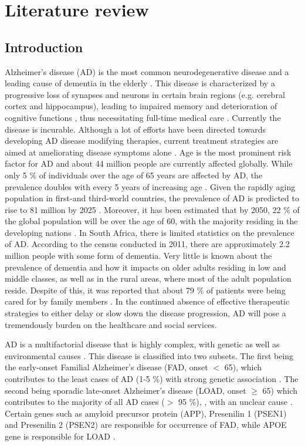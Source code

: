\chapter{Literature review}
\section{Introduction}
Alzheimer’s disease (AD) is the most common neurodegenerative disease and a leading cause of dementia in the elderly \citep{andrieu2015}. This disease is characterized by a progressive loss of synapses and neurons in certain brain regions (e.g. cerebral cortex and hippocampus), leading to impaired memory and deterioration of cognitive functions \citep{dekosky1990,scheff2006,zare-shahabadi2015}, thus necessitating full-time medical care \citep{prince2013}. Currently the disease is incurable. Although a lot of efforts have been directed towards developing AD disease modifying therapies, current treatment strategies are aimed at ameliorating disease symptoms alone \citep{anand2014,disanto2013}. Age is the most prominent risk factor for AD and about 44 million people are currently affected globally. While only 5 \% of individuals over the age of 65 years are affected by AD, the prevalence doubles with every 5 years of increasing age \citep{pimenova2018,qiu2009}. Given the rapidly aging population in first-and third-world countries, the prevalence of AD is predicted to rise to 81 million by 2025 \citep{AlzheimersAssociation2014,Ferri2005}. Moreover, it has been estimated that by 2050, 22 \% of the global population will be over the age of 60, with the majority residing in the developing nations \citep{Annear2015,Paddick2013}. In South Africa, there is limited statistics on the prevalence of AD. According to the census conducted in 2011, there are approximately 2.2 million people with some form of dementia. Very little is known about the prevalence of dementia and how it impacts on older adults residing in low and middle classes, as well as in the rural areas, where most of the adult population reside. Despite of this, it was reported that about 79 \% of patients were being cared for by family members \citep{Kalula2010}. In the continued absence of effective therapeutic strategies to either delay or slow down the disease progression, AD will pose a tremendously burden on the healthcare and social services. 

AD is a multifactorial disease that is highly complex, with genetic as well as environmental causes \citep{Dorszewska2016}. This disease is classified into two subsets. The first being the early-onset Familial Alzheimer’s disease (FAD, onset $<$ 65), which contributes to the least cases of AD (1-5 \%) with strong genetic association \citep{Musiek2015,Reitz2014,Swerdlow2007}. The second being sporadic late-onset Alzheimer’s disease (LOAD, onset $\geq$ 65) which contributes to the majority of all AD cases ($>$ 95 \%), \citep{Musiek2015,Reitz2014,Swerdlow2007}, with an unclear cause \citep{Dorszewska2016,pimenova2018}. Certain genes such as amyloid precursor protein (APP), Presenilin 1 (PSEN1) and Presenilin 2  (PSEN2) are responsible for occurrence of FAD, while APOE gene is responsible for LOAD \citep{Dorszewska2016}.


